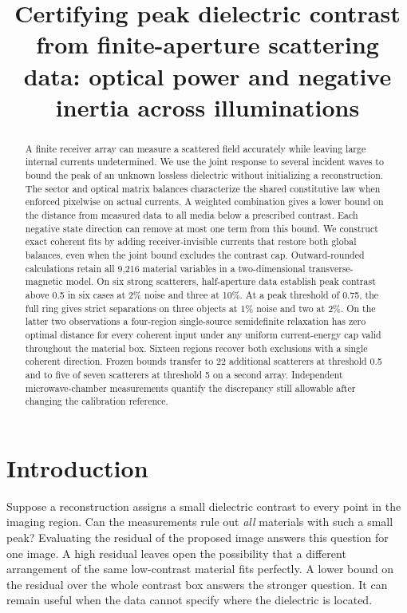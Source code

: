 \documentclass[anonymous,12pt]{iopjournal}
\theoremstyle{remark}\newtheorem{remark}[theorem]{Remark}
\numberwithin{equation}{section}
\begin{document}
\par\vspace{1.8ex}
\title{Certifying peak dielectric contrast from finite-aperture scattering data: optical power and negative inertia across illuminations}
\author{}
\begin{abstract}
A finite receiver array can measure a scattered field accurately while leaving large internal currents undetermined. We use the joint response to several incident waves to bound the peak of an unknown lossless dielectric without initializing a reconstruction. The sector and optical matrix balances characterize the shared constitutive law when enforced pixelwise on actual currents. A weighted combination gives a lower bound on the distance from measured data to all media below a prescribed contrast. Each negative state direction can remove at most one term from this bound. We construct exact coherent fits by adding receiver-invisible currents that restore both global balances, even when the joint bound excludes the contrast cap. Outward-rounded calculations retain all 9,216 material variables in a two-dimensional transverse-magnetic model. On six strong scatterers, half-aperture data establish peak contrast above 0.5 in six cases at 2\% noise and three at 10\%. At a peak threshold of 0.75, the full ring gives strict separations on three objects at 1\% noise and two at 2\%. On the latter two observations a four-region single-source semidefinite relaxation has zero optimal distance for every coherent input under any uniform current-energy cap valid throughout the material box. Sixteen regions recover both exclusions with a single coherent direction. Frozen bounds transfer to 22 additional scatterers at threshold 0.5 and to five of seven scatterers at threshold 5 on a second array. Independent microwave-chamber measurements quantify the discrepancy still allowable after changing the calibration reference.
\end{abstract}

\section{Introduction}\label{sec:intro}

Suppose a reconstruction assigns a small dielectric contrast to every point in the imaging region. Can the measurements rule out \emph{all} materials with such a small peak? Evaluating the residual of the proposed image answers this question for one image. A high residual leaves open the possibility that a different arrangement of the same low-contrast material fits perfectly. A lower bound on the residual over the whole contrast box answers the stronger question. It can remain useful when the data cannot specify where the dielectric is located.
\end{document}
